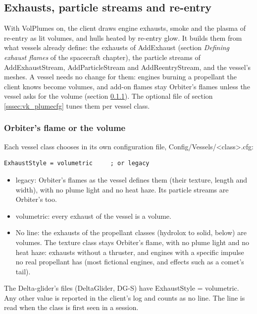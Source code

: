 \documentclass[Orbiter Developer Manual.tex]{subfiles}
\begin{document}
\begin{sloppypar}
\subsection{Exhausts, particle streams and re-entry}
\label{ssec:vk_plumes}
With VolPlumes on, the client draws engine exhausts, smoke and the plasma of re-entry as lit volumes, and hulls heated by re-entry glow. It builds them from what vessels already define: the exhausts of AddExhaust (section \textit{Defining exhaust flames} of the spacecraft chapter), the particle streams of AddExhaustStream, AddParticleStream and AddReentryStream, and the vessel's meshes. A vessel needs no change for them: engines burning a propellant the client knows become volumes, and add-on flames stay Orbiter's flames unless the vessel asks for the volume (section \ref{sssec:vk_exhauststyle}). The optional file of section \ref{sssec:vk_plumecfg} tunes them per vessel class.


\subsubsection{Orbiter's flame or the volume}
\label{sssec:vk_exhauststyle}
Each vessel class chooses in its own configuration file, Config/Vessels/<class>.cfg:

\begin{lstlisting}[language=OSFS]
ExhaustStyle = volumetric     ; or legacy
\end{lstlisting}

\begin{itemize}
\item legacy: Orbiter's flames as the vessel defines them (their texture, length and width), with no plume light and no heat haze. Its particle streams are Orbiter's too.
\item volumetric: every exhaust of the vessel is a volume.
\item No line: the exhausts of the propellant classes (hydrolox to solid, below) are volumes. The texture class stays Orbiter's flame, with no plume light and no heat haze: exhausts without a thruster, and engines with a specific impulse no real propellant has (most fictional engines, and effects such as a comet's tail).
\end{itemize}

\noindent
The Delta-glider's files (DeltaGlider, DG-S) have ExhaustStyle = volumetric. Any other value is reported in the client's log and counts as no line. The line is read when the class is first seen in a session.



\end{sloppypar}
\end{document}
